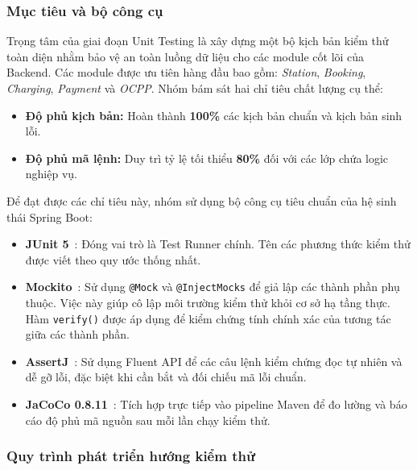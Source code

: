 \subsubsection{Mục tiêu và bộ công cụ}

\hspace*{\parindent}
Trọng tâm của giai đoạn Unit Testing là xây dựng một bộ kịch bản kiểm thử
toàn diện nhằm bảo vệ an toàn luồng dữ liệu cho các module cốt lõi của Backend.
Các module được ưu tiên hàng đầu bao gồm: \textit{Station}, \textit{Booking},
\textit{Charging}, \textit{Payment} và \textit{OCPP}. Nhóm bám sát hai chỉ tiêu
chất lượng cụ thể:

\begin{itemize}
    \item \textbf{Độ phủ kịch bản:} Hoàn thành \textbf{100\%} các kịch bản chuẩn và kịch bản sinh lỗi.

    \item \textbf{Độ phủ mã lệnh:} Duy trì tỷ lệ tối thiểu \textbf{80\%} đối với các lớp chứa logic nghiệp vụ.
\end{itemize}

Để đạt được các chỉ tiêu này, nhóm sử dụng bộ công cụ tiêu chuẩn của hệ sinh thái
Spring Boot:

\begin{itemize}
    \item \textbf{JUnit 5}~\cite{junit5}: Đóng vai trò là Test Runner chính.
          Tên các phương thức kiểm thử được viết theo quy ước thống nhất.

    \item \textbf{Mockito}~\cite{mockito}: Sử dụng \texttt{@Mock} và
          \texttt{@InjectMocks} để giả lập các thành phần phụ thuộc. Việc này giúp cô lập môi trường kiểm thử khỏi cơ sở hạ tầng thực. Hàm \texttt{verify()} được áp dụng để kiểm chứng tính chính xác của tương tác giữa các thành phần.

    \item \textbf{AssertJ}~\cite{assertj}: Sử dụng Fluent API để các câu lệnh kiểm chứng đọc tự nhiên và dễ gỡ lỗi, đặc biệt khi cần bắt và đối chiếu mã lỗi chuẩn.

    \item \textbf{JaCoCo 0.8.11}~\cite{jacoco}: Tích hợp trực tiếp vào pipeline
          Maven để đo lường và báo cáo độ phủ mã nguồn sau mỗi lần chạy kiểm thử.
\end{itemize}

\subsubsection{Quy trình phát triển hướng kiểm thử}

